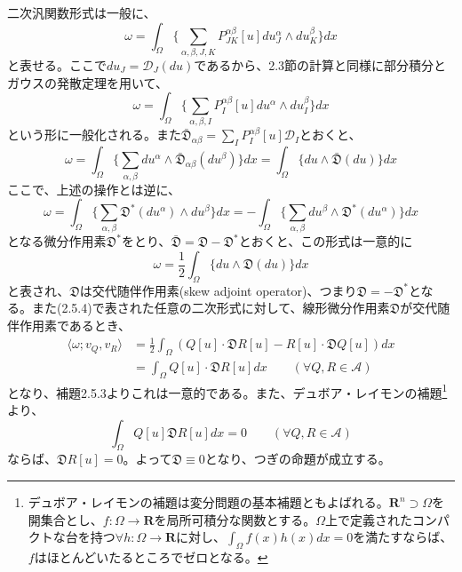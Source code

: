 \documentclass[a4paper, 11pt]{report}
\theoremstyle{definition}
\begin{document}
 二次汎関数形式は一般に、
\begin{equation*}
\omega = \int_\Omega \{ \sum _{\alpha,\beta,J,K} P^{\alpha\beta}_{JK}[u]du^\alpha_J \wedge du^\beta_K \} dx
\end{equation*}
と表せる。ここで$du_J=\mathcal{D}_J(du)$であるから、2.3節の計算と同様に部分積分とガウスの発散定理を用いて、
\begin{equation*}
\omega = \int_{\Omega} \{ \sum _{\alpha,\beta,I} P^{\alpha\beta}_I[u]du^\alpha \wedge du^\beta_I \} dx
\end{equation*}
という形に一般化される。また$\bar{\mathfrak{D}}_{\alpha\beta}=\sum_I P^{\alpha\beta}_I[u]\mathcal{D}_I$とおくと、
\begin{equation*}
\omega = \int_{\Omega} \{ \sum_{\alpha,\beta}du^\alpha \wedge \bar{\mathfrak{D}}_{\alpha\beta} (du^\beta) \} dx = \int_{\Omega} \{ du \wedge \bar{\mathfrak{D}} (du) \} dx
\end{equation*}
ここで、上述の操作とは逆に、
\begin{equation*}
\omega = \int_{\Omega} \{ \sum_{\alpha ,\beta}\mathfrak{D}^*(du^\alpha )\wedge du^\beta \} dx = -\int_{\Omega} \{ \sum_{\alpha ,\beta}du^\beta\wedge\mathfrak{D}^*(du^\alpha ) \} dx
\end{equation*}
となる微分作用素$\mathfrak{D}^*$をとり、$\bar{\mathfrak{D}}=\mathfrak{D}-\mathfrak{D}^*$とおくと、この形式は一意的に
\begin{equation}
\omega = \frac{1}{2} \int_\Omega \{ du \wedge \mathfrak{D}(du) \} dx %
\end{equation}
と表され、$\mathfrak{D}$は交代随伴作用素(skew adjoint operator)、つまり$\mathfrak{D}=-\mathfrak{D}^*$となる。また(2.5.4)で表された任意の二次形式に対して、線形微分作用素$\mathfrak{D}$が交代随伴作用素であるとき、
\begin{align*}
\langle \omega ;v_Q,v_R \rangle &= \frac{1}{2} \int_\Omega (Q[u]\cdot\mathfrak{D}R[u]-R[u]\cdot\mathfrak{D}Q[u]) dx\\
&= \int_\Omega Q[u]\cdot\mathfrak{D}R[u] dx \qquad (\forall Q, R \in \mathcal{A})
\end{align*}
となり、補題2.5.3よりこれは一意的である。また、デュボア・レイモンの補題\footnote{デュボア・レイモンの補題は変分問題の基本補題ともよばれる。$\mathbf{R}^{n}\supset \Omega$を開集合とし、$f:\Omega \longrightarrow \mathbf{R}$を局所可積分な関数とする。$\Omega$上で定義されたコンパクトな台を持つ$\forall h:\Omega \longrightarrow \mathbf{R}$に対し、$\int_\Omega f(x)h(x)dx=0$を満たすならば、$f$はほとんどいたるところでゼロとなる。}より、
\begin{equation*}
\int_\Omega Q[u]\mathfrak{D}R[u] dx = 0 \qquad (\forall Q, R \in \mathcal{A})
\end{equation*}
ならば、$\mathfrak{D}R[u]=0$。よって$\mathfrak{D}\equiv 0$となり、つぎの命題が成立する。
\end{document}
